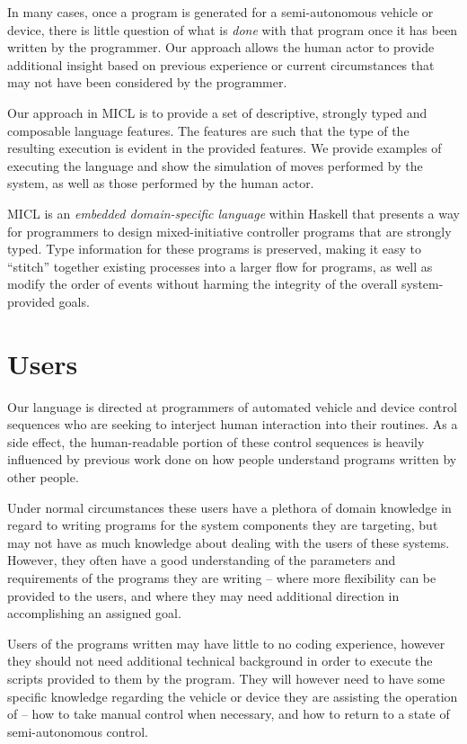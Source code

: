 \documentclass[11pt]{article}
\begin{document}
In many cases, once a program is generated for a semi-autonomous vehicle or
device, there is little question of what is \emph{done} with that program once
it has been written by the programmer. Our approach allows the human actor to
provide additional insight based on previous experience or current
circumstances that may not have been considered by the programmer.

Our approach in MICL is to provide a set of descriptive, strongly typed and
composable language features. The features are such that the type of the
resulting execution is evident in the provided features. We provide examples
of executing the language and show the simulation of moves performed by the
system, as well as those performed by the human actor.

MICL is an \emph{embedded domain-specific language} within Haskell that
presents a way for programmers to design mixed-initiative controller programs
that are strongly typed. Type information for these programs is preserved,
making it easy to ``stitch'' together existing processes into a larger flow
for programs, as well as modify the order of events without harming the
integrity of the overall system-provided goals.


\section{Users}
\label{sec:users}
Our language is directed at programmers of automated vehicle and device
control sequences who are seeking to interject human interaction into their
routines. As a side effect, the human-readable portion of these control
sequences is heavily influenced by previous work done on how people understand
programs written by other people. \cite{abbott2015prog}

Under normal circumstances these users have a plethora of domain knowledge in
regard to writing programs for the system components they are targeting, but
may not have as much knowledge about dealing with the users of these
systems. However, they often have a good understanding of the parameters and
requirements of the programs they are writing -- where more flexibility can be
provided to the users, and where they may need additional direction in
accomplishing an assigned goal.

Users of the programs written may have little to no coding experience,
however they should not need additional technical background in order to
execute the scripts provided to them by the program. They will however need to
have some specific knowledge regarding the vehicle or device they are
assisting the operation of -- how to take manual control when necessary, and
how to return to a state of semi-autonomous control.
\end{document}
